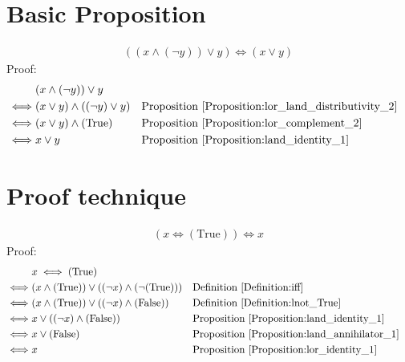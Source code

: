 \section{Basic Proposition}
\begin{prop}
\label{Proposition:x_lor_y_complement}
\begin{align*}
((x \land (\lnot y)) \lor y) \iff (x \lor y)
\end{align*}
Proof:
\begin{align*}
& (x \land (\lnot y)) \lor y \\
\iff & (x \lor y) \land ((\lnot y) \lor y)
&& \text{Proposition \ref{Proposition:lor_land_distributivity_2}} \\
\iff & (x \lor y) \land (\text{True})
&& \text{Proposition \ref{Proposition:lor_complement_2}} \\
\iff & x \lor y
&& \text{Proposition \ref{Proposition:land_identity_1}} \\
\end{align*}
\end{prop}

\section{Proof technique}
\begin{prop}
\begin{align*}
(x \iff (\text{True})) \iff x
\end{align*}
Proof:
\begin{align*}
& x \iff (\text{True}) \\
\iff & (x \land (\text{True})) \lor ((\lnot x) \land (\lnot (\text{True})))
&& \text{Definition \ref{Definition:iff}} \\
\iff & (x \land (\text{True})) \lor ((\lnot x) \land (\text{False}))
&& \text{Definition \ref{Definition:lnot_True}} \\
\iff & x \lor ((\lnot x) \land (\text{False}))
&& \text{Proposition \ref{Proposition:land_identity_1}} \\
\iff & x \lor (\text{False})
&& \text{Proposition \ref{Proposition:land_annihilator_1}} \\
\iff & x
&& \text{Proposition \ref{Proposition:lor_identity_1}} \\
\end{align*}
\end{prop}

